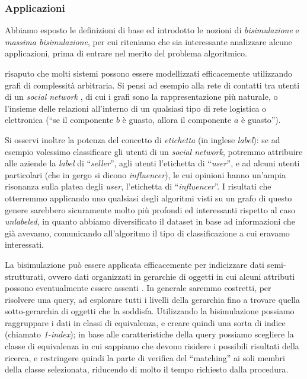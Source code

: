 \subsubsection{Applicazioni}
\label{sec:applications}
Abbiamo esposto le definizioni di base ed introdotto le nozioni di \emph{bisimulazione} e \emph{massima bisimulazione}, per cui riteniamo che sia interessante analizzare alcune applicazioni, prima di entrare nel merito del problema algoritmico.

\accente risaputo che molti sistemi possono essere modellizzati efficacemente utilizzando grafi di complessità arbitraria. Si pensi ad esempio alla rete di contatti tra utenti di un \emph{social network} \cite{twitter}, di cui i grafi sono la rappresentazione più naturale, o l'insieme delle relazioni all'interno di un qualsiasi tipo di rete logistica \cite{supply} o elettronica \cite{electric} (``se il componente $b$ è guasto, allora il componente $a$ è guasto'').

Si osservi inoltre la potenza del concetto di \emph{etichetta} (in inglese \emph{label}): se ad esempio volessimo classificare gli utenti di un \emph{social network}, potremmo attribuire alle aziende la \emph{label} di ``\emph{seller}'', agli utenti l'etichetta di ``\emph{user}'', e ad alcuni utenti particolari (che in gergo si dicono \emph{influencer}), le cui opinioni hanno un'ampia risonanza sulla platea degli \emph{user}, l'etichetta di ``\emph{influencer}''. I risultati che otterremmo applicando uno qualsiasi degli algoritmi visti su un grafo di questo genere sarebbero sicuramente molto più profondi ed interessanti rispetto al caso \emph{unlabeled}, in quanto abbiamo diversificato il dataset in base ad informazioni che già avevamo, comunicando all'algoritmo il tipo di classificazione a cui eravamo interessati.

La bisimulazione può essere applicata efficacemente per indicizzare dati semi-strutturati, ovvero dati organizzati in gerarchie di oggetti in cui alcuni attributi possono eventualmente essere assenti \cite{milo}. In generale saremmo costretti, per risolvere una query, ad esplorare tutti i livelli della gerarchia fino a trovare quella sotto-gerarchia di oggetti che la soddisfa. Utilizzando la bisimulazione possiamo raggruppare i dati in classi di equivalenza, e creare quindi una sorta di indice (chiamato \emph{1-index}); in base alle caratteristiche della query possiamo scegliere la classe di equivalenza in cui sappiamo che devono risidere i possibili risultati della ricerca, e restringere quindi la parte di verifica del ``matching'' ai soli membri della classe selezionata, riducendo di molto il tempo richiesto dalla procedura.

